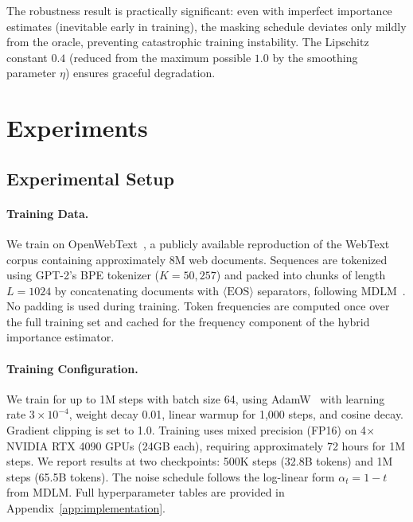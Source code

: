 \documentclass[11pt]{article}
\theoremstyle{remark}
\begin{document}
The robustness result is practically significant: even with imperfect importance estimates (inevitable early in training), the masking schedule deviates only mildly from the oracle, preventing catastrophic training instability. The Lipschitz constant $0.4$ (reduced from the maximum possible $1.0$ by the smoothing parameter $\eta$) ensures graceful degradation.

\section{Experiments}
\label{sec:experiments}

\subsection{Experimental Setup}

\paragraph{Training Data.} We train on OpenWebText~\citep{owt}, a publicly available reproduction of the WebText corpus containing approximately 8M web documents. Sequences are tokenized using GPT-2's BPE tokenizer ($K = 50{,}257$) and packed into chunks of length $L = 1024$ by concatenating documents with $\langle \text{EOS} \rangle$ separators, following MDLM~\citep{mdlm}. No padding is used during training. Token frequencies are computed once over the full training set and cached for the frequency component of the hybrid importance estimator.

\paragraph{Training Configuration.} We train for up to 1M steps with batch size 64, using AdamW~\citep{adamw} with learning rate $3 \times 10^{-4}$, weight decay 0.01, linear warmup for 1,000 steps, and cosine decay. Gradient clipping is set to 1.0. Training uses mixed precision (FP16) on 4$\times$ NVIDIA RTX 4090 GPUs (24GB each), requiring approximately 72 hours for 1M steps. We report results at two checkpoints: 500K steps (32.8B tokens) and 1M steps (65.5B tokens). The noise schedule follows the log-linear form $\alpha_t = 1 - t$ from MDLM. Full hyperparameter tables are provided in Appendix~\ref{app:implementation}.
\end{document}

